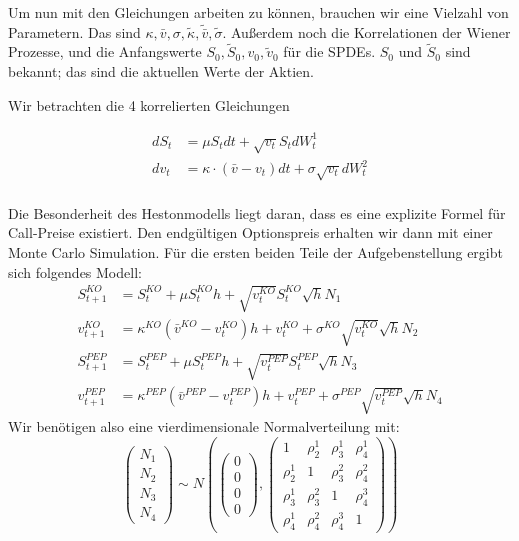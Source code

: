 \documentclass[12pt]{article}
\begin{document}
Um nun mit den Gleichungen arbeiten zu können, brauchen wir eine Vielzahl von Parametern. Das sind $\kappa, \bar{v}, \sigma, \tilde{\kappa}, \tilde{\bar{v}}, \tilde{\sigma}$. Außerdem noch die Korrelationen der Wiener Prozesse, und die Anfangswerte $S_0, \tilde{S}_0, v_0, \tilde{v}_0$ für die SPDEs. $S_0$ und $\tilde{S}_0$ sind bekannt; das sind die aktuellen Werte der Aktien.

Wir betrachten die 4 korrelierten Gleichungen

\begin{align} \label{SPDE}
dS_t &= \mu S_t dt + \sqrt{v_t} S_t dW^1_t \\
dv_t &= \kappa\cdot(\bar{v}-v_t) dt + \sigma \sqrt{v_t}dW^2_t \\
\end{align}

 Die Besonderheit des Hestonmodells liegt daran, dass es eine explizite Formel für Call-Preise existiert. Den endgültigen Optionspreis erhalten wir dann mit einer Monte Carlo Simulation. Für die ersten beiden Teile der Aufgebenstellung ergibt sich folgendes Modell:
\begin{align*}
S^{KO}_{t+1}&=S^{KO}_{t}+\mu S^{KO}_{t}h+\sqrt{v^{KO}_t}S^{KO}_{t}\sqrt{h}N_1\\
v^{KO}_{t+1}&=\kappa^{KO}(\bar{v}^{KO}-v^{KO}_t)h+v^{KO}_t+\sigma^{KO}\sqrt{v^{KO}_t}\sqrt{h}N_2\\
S^{PEP}_{t+1}&=S^{PEP}_{t}+\mu S^{PEP}_{t}h+\sqrt{v^{PEP}_t}S^{PEP}_{t}\sqrt{h}N_3\\
v^{PEP}_{t+1}&=\kappa^{PEP}(\bar{v}^{PEP}-v^{PEP}_t)h+v^{PEP}_t+\sigma^{PEP}\sqrt{v^{PEP}_t}\sqrt{h}N_4
\end{align*}
Wir benötigen also eine vierdimensionale Normalverteilung mit:
\begin{equation*}
\left({\begin{array}{c} N_1\\ N_2\\ N_3\\ N_4\end{array}}\right) \sim N\left(\left({\begin{array}{c} 0 \\ 0 \\ 0 \\ 0 \end{array}}\right),\left({\begin{array}{cccc} 1 & \rho^1_2 & \rho^1_3 & \rho^1_4\\ \rho^1_2 & 1 & \rho^2_3 & \rho^2_4 \\ \rho^1_3 & \rho^2_3 & 1 & \rho^3_4 \\ \rho^1_4 & \rho^2_4 & \rho^3_4 & 1 \end{array}}\right)\right)
\end{equation*}
\end{document}
